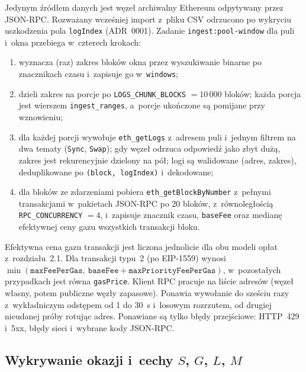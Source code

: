 Jedynym źródłem danych jest węzeł archiwalny Ethereum odpytywany przez JSON-RPC. Rozważany wcześniej
import z~pliku CSV odrzucono po wykryciu uszkodzenia pola \texttt{logIndex} (ADR~0001).
Zadanie \texttt{ingest:pool-window} dla puli i~okna przebiega w~czterech krokach:
\begin{enumerate}[nosep]
  \item wyznacza (raz) zakres bloków okna przez wyszukiwanie binarne po znacznikach czasu
        i~zapisuje go w~\texttt{windows};
  \item dzieli zakres na porcje po \texttt{LOGS\_CHUNK\_BLOCKS} $=10\,000$ bloków; każda porcja jest
        wierszem \texttt{ingest\_ranges}, a~porcje ukończone są pomijane przy wznowieniu;
  \item dla każdej porcji wywołuje \texttt{eth\_getLogs} z~adresem puli i~jednym filtrem na dwa
        tematy (\texttt{Sync}, \texttt{Swap}); gdy węzeł odrzuca odpowiedź jako zbyt dużą, zakres
        jest rekurencyjnie dzielony na pół; logi są walidowane (adres, zakres), deduplikowane po
        \texttt{(block, logIndex)} i~dekodowane;
  \item dla bloków ze zdarzeniami pobiera \texttt{eth\_getBlockByNumber} z~pełnymi transakcjami
        w~pakietach JSON-RPC po 20 bloków, z~równoległością \texttt{RPC\_CONCURRENCY} $=4$,
        i~zapisuje znacznik czasu, \texttt{baseFee} oraz medianę efektywnej ceny gazu wszystkich
        transakcji bloku.
\end{enumerate}
Efektywna cena gazu transakcji jest liczona jednolicie dla obu modeli opłat z~rozdziału~2.1.
Dla transakcji typu~2 (po EIP-1559) wynosi $\min(\texttt{maxFeePerGas},\ \texttt{baseFee} +
\texttt{maxPriorityFeePerGas})$, w~pozostałych przypadkach jest równa \texttt{gasPrice}. Klient
RPC pracuje na liście adresów (węzeł własny, potem publiczne węzły zapasowe). Ponawia wywołanie
do sześciu razy z~wykładniczym odstępem od 1 do 30~s i~losowym rozrzutem, od drugiej nieudanej
próby rotując adres. Ponawiane są tylko błędy przejściowe: HTTP~429 i~5xx, błędy sieci
i~wybrane kody JSON-RPC.

\subsection{Wykrywanie okazji i~cechy $S$, $G$, $L$, $M$}

